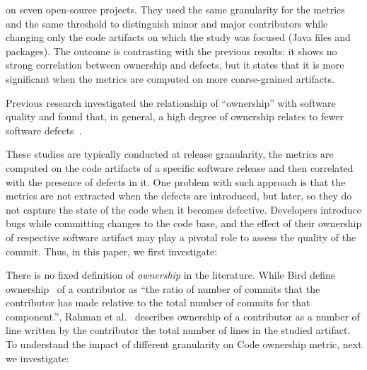 on seven
open-source projects. They used the same granularity for the metrics and the
same threshold to distinguish minor and major contributors while changing only
the code artifacts on which the study was focused (Java files and packages).
The outcome is contrasting with the previous results: it shows no strong
correlation between ownership and defects, but it states that it is more
significant when the metrics are computed on more coarse-grained artifacts.


Previous research investigated the relationship of ``ownership'' with software
quality and found that, in general, a high degree of ownership relates to fewer
software defects~\cite{bird:original}.

These studies are typically
conducted at release granularity, 
\ie the metrics are computed on the code artifacts of a specific software
release and then correlated with the presence of defects in it. 
One problem with such approach is that the metrics are not extracted when the
defects are introduced, but later, so they do not capture the state of the code
when it becomes defective. Developers introduce bugs while committing changes
to the code base, and the effect of their ownership of respective software
artifact may play a pivotal role to assess the quality of the commit.  Thus, in
this paper, we first investigate:


There is no fixed definition of {\em ownership} in the literature. While Bird
\etal define ownership~\cite{bird:original} of a contributor as ``the ratio of
number of commits that the contributor has made relative to the total
number of commits for that component.'', Rahman et al.~\cite{Rahman:blame}
describes ownership of a contributor as a number of line written by the
contributor \wrt the total number of lines in the studied artifact. To
understand the impact of different granularity on Code ownership metric, next
we investigate: 



